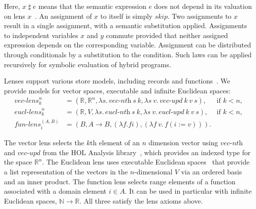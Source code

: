 \documentclass[envcountsame,envcountsect]{llncs}
\newcommand{\sskip}{\mathit{skip}}
\newcommand{\Pow}{\mathcal{P}}
\newcommand{\reals}{\mathbb{R}}
\newcommand{\unrest}{\mathop{\sharp}}
\begin{document}
Here, $x \unrest e$ means that the semantic expression $e$
does not depend in its valuation on lens
$x$~\cite{FosterZW16}. An assignment of $x$ to itself is
simply $\sskip$. Two assignments to $x$ result in a single
assignment, with a semantic substitution
applied. Assignments to independent variables $x$ and $y$
commute provided that neither assigned expression depends on
the corresponding variable.  Assignment can be distributed
through conditionals by a substitution to the
condition. Such laws can be applied recursively for symbolic
evaluation of hybrid programs.

Lenses support various store models, including records and
functions~\cite{FosterZW16}. We provide models for
vector spaces, executable and infinite Euclidean spaces:
%
\begin{align*}
  \textit{vec-lens}^n_k &=  (\reals, \reals^n, \lambda s.\, \textit{vec-nth}~s~k, \lambda s~v.\, \textit{vec-upd}~k~v~s), & \text{if~} k < n, \\
  \textit{eucl-lens}^n_k & = (\reals, V, \lambda s.\, \textit{eucl-nth}~s~k, \lambda s~v.\, \textit{eucl-upd}~k~v~s), & \text{if~} k < n, \\
  \textit{fun-lens}^{(A,B)}_i &= (B, A \to B, (\lambda f. f i), (\lambda f~v. \, f(i := v))).
\end{align*}

\noindent The vector lens selects the $k$th element of an $n$
dimension vector using $\textit{vec-nth}$ and $\textit{vec-upd}$ from
the HOL Analysis library~\cite{HolzlIH13}, which provides an indexed
type for the space $\reals^n$. The Euclidean lens uses executable Euclidean
spaces~\cite{ImmlerT19} that provide a list representation of the vectors in the 
$n$-dimensional $V$ via an ordered basis and an inner product. The
function lens selects range elements of a function associated with a
domain element $i \in A$. It can be used in particular with infinite
Euclidean spaces, $\mathbb{N} \to \reals$. All three satisfy the lens
axioms above.
\end{document}
